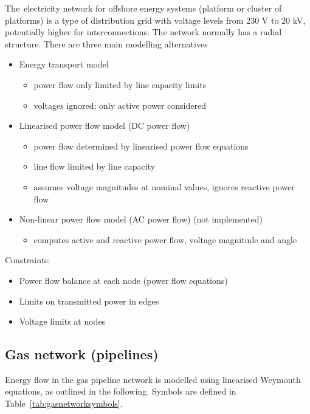 \documentclass[12pt]{article}
\begin{document}
The\ electricity network for offshore energy systems (platform or cluster of platforms) is a type of distribution grid with voltage levels from 230 V to 20 kV, potentially higher for interconnections. The network normally has a radial structure.  There are three main modelling alternatives
\begin{itemize}
	\item Energy transport model
\begin{itemize}
	\item power flow only limited by line capacity limits
	\item voltages ignored; only active power considered

\end{itemize}
	\item Linearised power flow model (DC power flow)
\begin{itemize}
	\item power flow determined by linearised power flow equations
	\item line flow limited by line capacity 
	\item assumes voltage magnitudes at nominal values, ignores reactive power flow

\end{itemize}
	\item Non-linear power flow model (AC power flow) (not implemented)
\begin{itemize}
	\item computes active and reactive power flow, voltage magnitude and angle
\end{itemize}
\end{itemize}




\noindent
Constraints:
\begin{itemize}
	\item Power flow balance at each node (power flow equations)
	\item Limits on transmitted power in edges
	\item Voltage limits at nodes
\end{itemize}


\subsection{Gas network (pipelines)}

Energy flow in the gas pipeline network is modelled using linearised Weymouth equations, as outlined in the following. 
Symbols are defined in Table~\ref{tab:gasnetworksymbols}.
\end{document}
